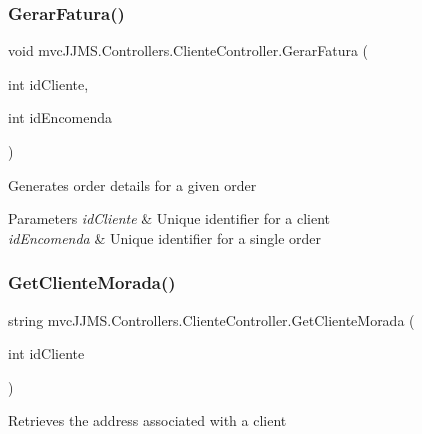 \subsubsection{\texorpdfstring{Gerar\+Fatura()}{GerarFatura()}}
{\footnotesize\ttfamily void mvc\+J\+J\+M\+S.\+Controllers.\+Cliente\+Controller.\+Gerar\+Fatura (\begin{DoxyParamCaption}\item[{int}]{id\+Cliente,  }\item[{int}]{id\+Encomenda }\end{DoxyParamCaption})\hspace{0.3cm}{\ttfamily [inline]}}



Generates order details for a given order 


\begin{DoxyParams}{Parameters}
{\em id\+Cliente} & Unique identifier for a client\\
\hline
{\em id\+Encomenda} & Unique identifier for a single order\\
\hline
\end{DoxyParams}
\mbox{\label{classmvc_j_j_m_s_1_1_controllers_1_1_cliente_controller_a6925f8c7f2234512eceb9e027c987ca9}} 
\subsubsection{\texorpdfstring{Get\+Cliente\+Morada()}{GetClienteMorada()}}
{\footnotesize\ttfamily string mvc\+J\+J\+M\+S.\+Controllers.\+Cliente\+Controller.\+Get\+Cliente\+Morada (\begin{DoxyParamCaption}\item[{int}]{id\+Cliente }\end{DoxyParamCaption})\hspace{0.3cm}{\ttfamily [inline]}}



Retrieves the address associated with a client 


